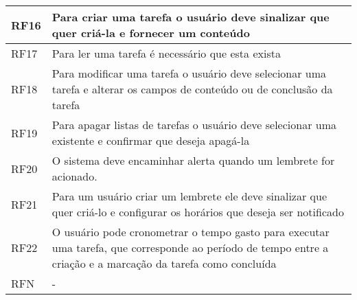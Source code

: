 \documentclass[
	12pt,				%
	oneside,			%
	a4paper,			%
	english,			%
	brazil,				%
	]{abntex2}
\begin{document}
\begin{longtable}{@{}p{}p{}@{}}
RF16 & Para criar uma tarefa o usuário deve sinalizar que quer criá-la e fornecer um conteúdo \\ \midrule
RF17 & Para ler uma tarefa é necessário que esta exista \\ \midrule
RF18 & Para modificar uma tarefa o usuário deve selecionar uma tarefa e alterar os campos de conteúdo ou de conclusão da tarefa \\ \midrule
RF19 & Para apagar listas de tarefas o usuário deve selecionar uma existente e confirmar que deseja apagá-la \\ \midrule
RF20 & O sistema deve encaminhar alerta quando um lembrete for acionado. \\ \midrule
RF21 & Para um usuário criar um lembrete ele deve sinalizar que quer criá-lo e configurar os horários que deseja ser notificado\\ \midrule
RF22 & O usuário pode cronometrar o tempo gasto para executar uma tarefa, que corresponde ao período de tempo entre a criação  e a marcação da tarefa como concluída \\ \midrule



RFN & - \\ \bottomrule
\end{longtable}




% 

\end{document}
